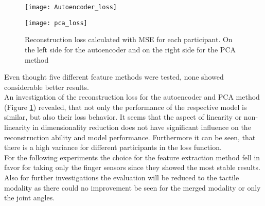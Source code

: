 \begin{figure}[H]
	\centering
	\begin{minipage}{0.495\textwidth}
		\centering
		\texttt{[image: Autoencoder\_loss]}
	\end{minipage}
	\begin{minipage}{0.495\textwidth}
		\centering
		\texttt{[image: pca\_loss]}
	\end{minipage}
	\caption{Reconstruction loss calculated with MSE for each participant. On the left side for the autoencoder and on the right side for the PCA method}
	\label{ae_pca_loss}
\end{figure}
Even thought five different feature methods were tested, none showed considerable better results.\\
An investigation of the reconstruction loss for the autoencoder and PCA method (Figure \ref{ae_pca_loss}) revealed, that not only the performance of the respective model is similar, but also their loss behavior. It seems that the aspect of linearity or non-linearity in dimensionality reduction does not have significant influence on the reconstruction ability and model performance. Furthermore it can be seen, that there is a high variance for different participants in the loss function.\\
For the following experiments the choice for the feature extraction method fell in favor for taking only the finger sensors since they showed the most stable results. Also for further investigations the evaluation will be reduced to the tactile modality as there could no improvement be seen for the merged modality or only the joint angles.
